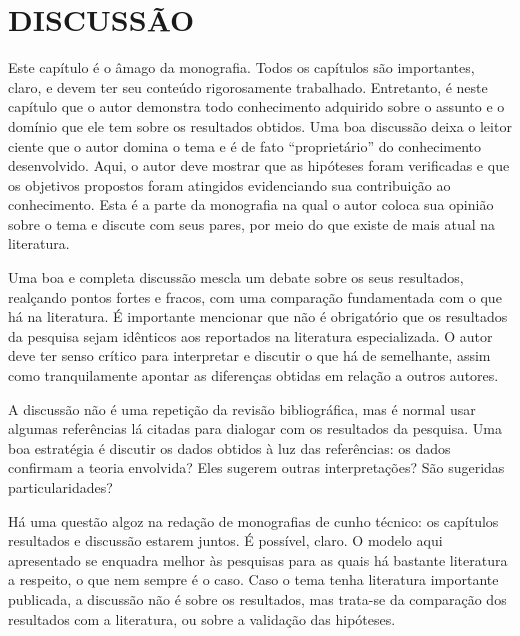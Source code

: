 \chapter{DISCUSSÃO}
Este capítulo é o âmago da monografia. Todos os capítulos são importantes, claro, e devem ter seu conteúdo rigorosamente trabalhado. Entretanto, é neste capítulo que o autor demonstra todo conhecimento adquirido sobre o assunto e o domínio que ele tem sobre os resultados obtidos. Uma boa discussão deixa o leitor ciente que o autor domina o tema e é de fato “proprietário” do conhecimento desenvolvido. Aqui, o autor deve mostrar que as hipóteses foram verificadas e que os objetivos propostos foram atingidos evidenciando sua contribuição ao conhecimento. Esta é a parte da monografia na qual o autor coloca sua opinião sobre o tema e discute com seus pares, por meio do que existe de mais atual na literatura.

Uma boa e completa discussão mescla um debate sobre os seus resultados, realçando pontos fortes e fracos, com uma comparação fundamentada com o que há na literatura. É importante mencionar que não é obrigatório que os resultados da pesquisa sejam idênticos aos reportados na literatura especializada. O autor deve ter senso crítico para interpretar e discutir o que há de semelhante, assim como tranquilamente apontar as diferenças obtidas em relação a outros autores.

A discussão não é uma repetição da revisão bibliográfica, mas é normal usar algumas referências lá citadas para dialogar com os resultados da pesquisa. Uma boa estratégia é discutir os dados obtidos à luz das referências: os dados confirmam a teoria envolvida? Eles sugerem outras interpretações? São sugeridas particularidades?

Há uma questão algoz na redação de monografias de cunho técnico: os capítulos resultados e discussão estarem juntos. É possível, claro. O modelo aqui apresentado se enquadra melhor às pesquisas para as quais há bastante literatura a respeito, o que nem sempre é o caso. Caso o tema tenha literatura importante publicada, a discussão não é sobre os resultados, mas trata-se da comparação dos resultados com a literatura, ou sobre a validação das hipóteses.
